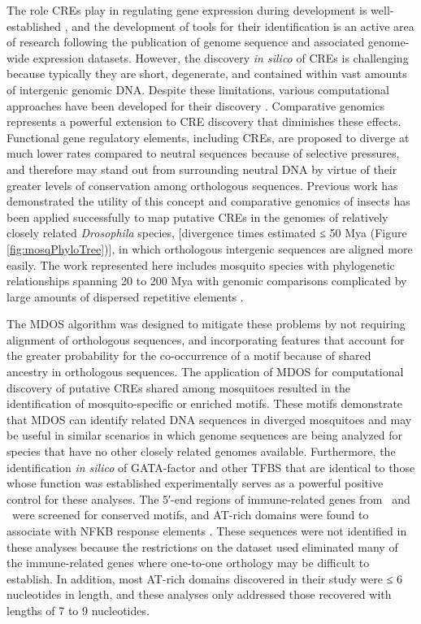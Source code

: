 The role \glspl{CRE} play in regulating gene expression during development is well-established \cite{Davidson2010}, and the development of tools for their identification is an active area of research following the publication of genome sequence and associated genome-wide expression datasets. However, the discovery \textit{in silico} of \glspl{CRE} is challenging because typically they are short, degenerate, and contained within vast amounts of intergenic genomic DNA. Despite these limitations, various computational approaches have been developed for their discovery \cite{Das2007a,Hu2005,Tompa2005,Wasserman2004}. Comparative genomics represents a powerful extension to \gls{CRE} discovery that diminishes these effects. Functional gene regulatory elements, including \glspl{CRE}, are proposed to diverge at much lower rates compared to neutral sequences because of selective pressures, and therefore may stand out from surrounding neutral DNA by virtue of their greater levels of conservation among orthologous sequences. Previous work has demonstrated the utility of this concept \cite{Elemento2005,Stark2007,Xie2005} and comparative genomics of insects has been applied successfully to map putative \glspl{CRE} in the genomes of relatively closely related \textit{Drosophila} species, [divergence times estimated ≤ 50 \gls{Mya} \cite{Stark2007} (Figure \ref{fig:mosqPhyloTree})], in which orthologous intergenic sequences are aligned more easily. The work represented here includes mosquito species with phylogenetic relationships spanning 20 to 200 \gls{Mya} with genomic comparisons complicated by large amounts of dispersed repetitive elements \cite{Nene2007}.

The \gls{MDOS} algorithm \cite{Wu2008} was designed to mitigate these problems by not requiring alignment of orthologous sequences, and incorporating features that account for the greater probability for the co-occurrence of a motif because of shared ancestry in orthologous sequences. The application of \gls{MDOS} for computational discovery of putative \glspl{CRE} shared among mosquitoes resulted in the identification of mosquito-specific or enriched motifs. These motifs demonstrate that \gls{MDOS} can identify related DNA sequences in diverged mosquitoes and may be useful in similar scenarios in which genome sequences are being analyzed for species that have no other closely related genomes available. Furthermore, the identification \textit{in silico} of GATA-factor and other \gls{TFBS} that are identical to those whose function was established experimentally \cite{Kokoza2001,Cho2006,Attardo2003,Ahmed1999,Pham2005,Giannoni2001,Dittmer2003,Meredith2006} serves as a powerful positive control for these analyses. The 5′-end regions of immune-related genes from \Ag\ and \Dm\ were screened for conserved motifs, and AT-rich domains were found to associate with \gls{NFKB} response elements \cite{Hernandez-Romano2008}. These sequences were not identified in these analyses because the restrictions on the dataset used eliminated many of the immune-related genes where one-to-one orthology may be difficult to establish. In addition, most AT-rich domains discovered in their study were ≤ 6 nucleotides in length, and these analyses only addressed those recovered with lengths of 7 to 9 nucleotides.

